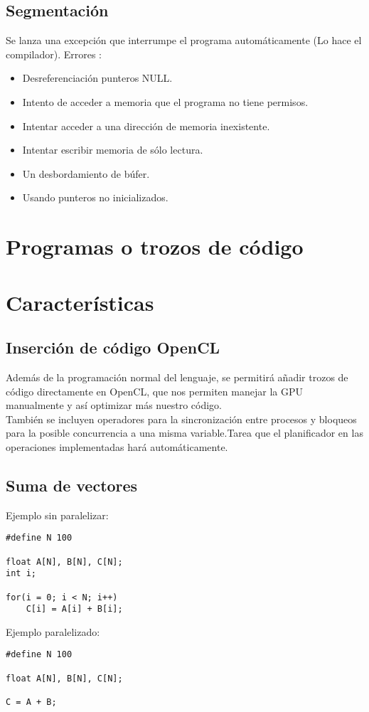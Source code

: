 \documentclass[12pt,a4paper]{article}
\begin{document}
\subsection{Segmentación}
Se lanza una excepción que interrumpe el programa automáticamente (Lo hace el
compilador).
Errores :
\begin{itemize}
\item Desreferenciación punteros NULL.
\item Intento de acceder a memoria que el programa no tiene permisos.
\item Intentar acceder a una dirección de memoria inexistente.
\item Intentar escribir memoria de sólo lectura.
\item Un desbordamiento de búfer. 
\item Usando punteros no inicializados.
\end{itemize}
\section{Programas o trozos de código}
\section{Características}
\subsection{Inserción de código OpenCL}
Además de la programación normal del lenguaje, se permitirá añadir trozos de código directamente en OpenCL, que nos permiten manejar la GPU manualmente y así optimizar más nuestro código. 
 \\ También se incluyen operadores para la sincronización entre procesos y bloqueos para la posible concurrencia a una misma variable.Tarea que el planificador en las operaciones implementadas hará automáticamente.
\subsection{Suma de vectores}
Ejemplo sin paralelizar:
\begin{lstlisting}
#define N 100

float A[N], B[N], C[N];
int i;

for(i = 0; i < N; i++)
	C[i] = A[i] + B[i];
\end{lstlisting}

Ejemplo paralelizado:
\begin{lstlisting}
#define N 100

float A[N], B[N], C[N];

C = A + B;
\end{lstlisting}
\end{document}
